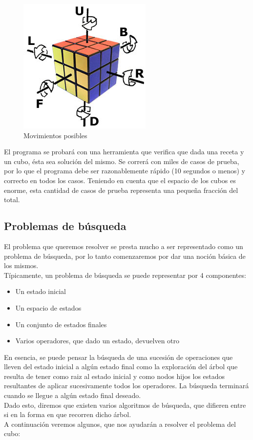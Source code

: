 \documentclass[11pt,a4paper]{article}
\begin{document}
\begin{figure}
  \centering
    \includegraphics{img/giros}
  \caption{Movimientos posibles}
  \label{fig:ejemplo}
\end{figure}

El programa se probará con una herramienta que verifica que dada una receta y un cubo, ésta sea solución del mismo. Se correrá con miles de casos de prueba, por lo que el programa debe ser razonablemente rápido (10 segundos o menos) y correcto en todos los casos. Teniendo en cuenta que el espacio de los cubos es enorme, esta cantidad de casos de prueba representa una pequeña fracción del total.


\subsection{Problemas de búsqueda}
El problema que queremos resolver se presta mucho a ser representado como un problema de búsqueda, por lo tanto comenzaremos por dar una noción básica de los mismos. \\
Típicamente, un problema de búsqueda se puede representar por 4 componentes:
\begin{itemize}
\item Un estado inicial
\item Un espacio de estados
\item Un conjunto de estados finales 
\item Varios operadores, que dado un estado, devuelven otro
\end{itemize}
En esencia, se puede pensar la búsqueda de una sucesión de operaciones que lleven del estado inicial a algún estado final como la exploración del árbol que resulta de tener como raiz al estado inicial y como nodos hijos los estados resultantes de aplicar sucesivamente todos los operadores. La búsqueda terminará cuando se llegue a algún estado final deseado.\\
Dado esto, diremos que existen varios algoritmos de búsqueda, que difieren entre si en la forma en que recorren dicho árbol.\\
A continuación veremos algunos, que nos ayudarán a resolver el problema del cubo:
\end{document}
